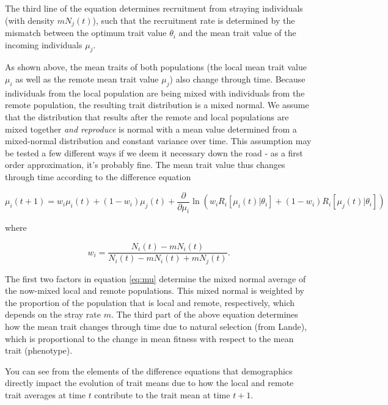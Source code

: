 \documentclass[onecolumn,preprintnumbers,amsmath,amssymb,superscriptaddress]{revtex4}
\begin{document}
The third line of the equation determines recruitment from straying individuals (with density $mN_j(t)$), such that the recruitment rate is determined by the mismatch between the optimum trait value $\theta_i$ and the mean trait value of the incoming individuals $\mu_j$.

As shown above, the mean traits of both populations (the local mean trait value $\mu_i$ as well as the remote mean trait value $\mu_j$) also change through time.
Because individuals from the local population are being mixed with individuals from the remote population, the resulting trait distribution is a mixed normal.
We assume that the distribution that results after the remote and local populations are mixed together \emph{and reproduce} is normal with a mean value determined from a mixed-normal distribution and constant variance over time.
This assumption may be tested a few different ways if we deem it necessary down the road - as a first order approximation, it's probably fine.
The mean trait value thus changes through time according to the difference equation

\begin{equation}
  \mu_i(t+1) = w_i\mu_i(t) + (1-w_i)\mu_j(t) + \frac{\partial}{\partial \mu_i}\ln\left(w_i R_i[\mu_i(t)|\theta_i] + (1-w_i)R_i[\mu_j(t)|\theta_i]  \right)
  \label{eq:mu}
\end{equation}

\noindent where

\begin{equation}
  w_i=\frac{N_i(t)-m N_i(t)}{N_i(t)-m N_i(t) + m N_j(t)}.
\end{equation}

The first two factors in equation \ref{eq:mu} determine the mixed normal average of the now-mixed local and remote populations.
This mixed normal is weighted by the proportion of the population that is local and remote, respectively, which depends on the stray rate $m$.
The third part of the above equation determines how the mean trait changes through time due to natural selection (from Lande), which is proportional to the change in mean fitness with respect to the mean trait (phenotype).

You can see from the elements of the difference equations that demographics directly impact the evolution of trait means due to how the local and remote trait averages at time $t$ contribute to the trait mean at time $t+1$.

\end{document}

